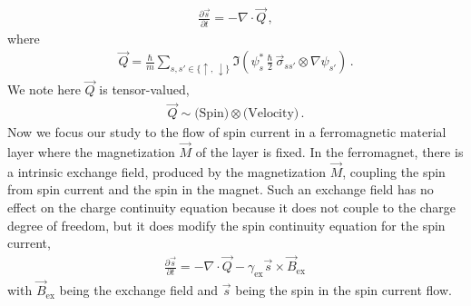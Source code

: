 \documentclass[11pt, onesided]{book}
\theoremstyle{break}
\theoremstyle{break}
\newcommand{\pd}{\partial}
\begin{document}
\begin{align*}
\frac{\pd \vec{s}}{\pd t} = -\nabla \cdot \vec{Q}\,,
\end{align*}
where 
\begin{align*}
\vec{Q} = \frac{\hbar}{m}\sum_{s,s'\in \{\uparrow,\,\downarrow\}} \Im\left(
\psi_s^*\,\frac{\hbar}{2}\,\vec{\sigma}_{ss'}\otimes \nabla\psi_{s'}
\right) \,.
\end{align*}
We note here $\vec{Q}$ is tensor-valued,
\begin{align*}
\vec{Q} \sim \text{(Spin)}\otimes \text{(Velocity)}\,.
\end{align*}
Now we focus our study to the flow of spin current in a ferromagnetic material layer where the magnetization $\vec{M}$ of the layer is fixed. In the ferromagnet, there is a intrinsic exchange field, produced by the magnetization $\vec{M}$, coupling the spin from spin current and the spin in the magnet. Such an exchange field has no effect on the charge continuity equation because it does not couple to the charge degree of freedom, but it does modify the spin continuity equation for the spin current,
\begin{align*}
\frac{\pd \vec{s}}{\pd t} = -\nabla \cdot\vec{Q} - \gamma_{\text{ex}} \vec{s}\times \vec{B}_{\text{ex}}\, \tag{$\dagger$}
\end{align*}
with $\vec{B}_{\text{ex}}$ being the exchange field and $\vec{s}$ being the spin in the spin current flow. \\
\end{document}
